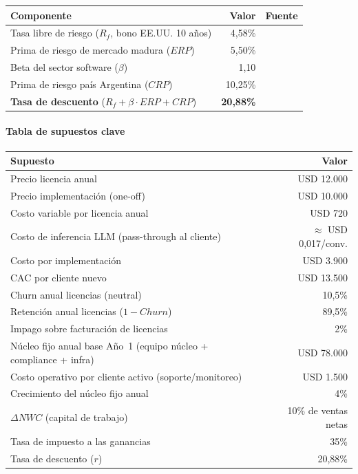 \begin{center}
\label{tab:capm}
\footnotesize
\begin{tabular}{lrl}
\toprule
\textbf{Componente} & \textbf{Valor} & \textbf{Fuente} \\
\midrule
Tasa libre de riesgo ($R_f$, bono EE.UU. 10 años) & 4,58\% & \textcite{TradingEconomics2025} \\
Prima de riesgo de mercado madura ($ERP$) & 5,50\% & \textcite{Damodaran2024} \\
Beta del sector software ($\beta$) & 1,10 & \textcite{Damodaran2024} \\
Prima de riesgo país Argentina ($CRP$) & 10,25\% & \textcite{Damodaran2024} \\
\midrule
\textbf{Tasa de descuento} ($R_f + \beta\cdot ERP + CRP$) & \textbf{20,88\%} & \\
\bottomrule
\end{tabular}
\end{center}

\paragraph{Tabla de supuestos clave}
\begin{center}
\label{tab:supuestos-churn}
\footnotesize
\begin{tabular}{l r}
\toprule
\textbf{Supuesto} & \textbf{Valor} \\
\midrule
Precio licencia anual & USD 12.000 \\
Precio implementación (one-off) & USD 10.000 \\
Costo variable por licencia anual & USD 720 \\
Costo de inferencia LLM (pass-through al cliente) & $\approx$ USD 0,017/conv. \\
Costo por implementación & USD 3.900 \\
CAC por cliente nuevo & USD 13.500 \\
Churn anual licencias (neutral) & 10,5\% \\
Retención anual licencias ($1-Churn$) & 89,5\% \\
Impago sobre facturación de licencias & 2\% \\
Núcleo fijo anual base Año~1 (equipo núcleo + compliance + infra) & USD 78.000 \\
Costo operativo por cliente activo (soporte/monitoreo) & USD 1.500 \\
Crecimiento del núcleo fijo anual & 4\% \\
$\Delta NWC$ (capital de trabajo) & 10\% de ventas netas \\
Tasa de impuesto a las ganancias & 35\% \\
Tasa de descuento ($r$) & 20,88\% \\
\bottomrule
\end{tabular}
\end{center}

